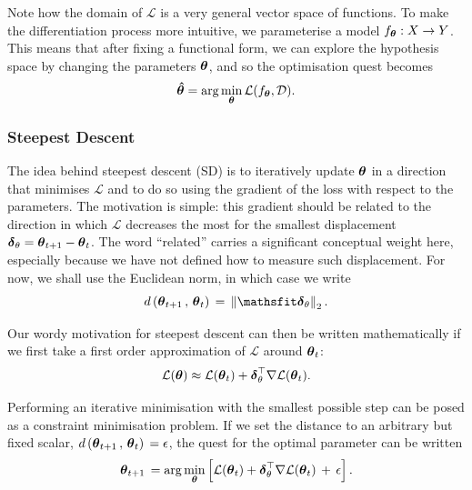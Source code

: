 Note how the domain of $\mathcal{L}$ is a very general vector space of functions. To make the differentiation process more intuitive, we parameterise a model $f_{\boldsymbol{\theta}}: X \to Y$. This means that after fixing a functional form, we can explore the hypothesis space by changing the parameters $\boldsymbol{\theta}$, and so the optimisation quest becomes
\begin{equation}
\boldsymbol{\hat{\theta}} = \text{arg}\min_{\boldsymbol{\theta}} \mathcal{L} (f_{\boldsymbol{\theta}}, \mathcal{D}).
\label{eq:optimisation}
\end{equation}

\subsubsection{Steepest Descent}\label{sub:steepest}
The idea behind steepest descent (SD) is to iteratively update $\boldsymbol{\theta}$ in a direction that minimises $\mathcal{L}$ and to do so using the gradient of the loss with respect to the parameters. The motivation is simple: this gradient should be related to the direction in which $\mathcal{L}$ decreases the most for the smallest displacement $\boldsymbol{\delta}_{\theta} = \boldsymbol{\theta}_{t+1} - \boldsymbol{\theta}_{t}$. The word ``related'' carries a significant conceptual weight here, especially because we have not defined how to measure such displacement. For now, we shall use the Euclidean norm, in which case we write
\begin{equation*}
d\left(\mvec{\theta}_{t+1}\,,\,\mvec{\theta}_{t}\right)\,=\,\norm{ \mvec{\delta}_{\theta}}_2.
\label{eq:dist}
\end{equation*}

Our wordy motivation for steepest descent can then be written mathematically if we first take a first order approximation of $\mathcal{L}$ around $\boldsymbol{\theta}_{t}$:
\begin{equation}
    \mathcal{L}(\boldsymbol{\theta}) \approx \mathcal{L}(\boldsymbol{\theta}_{t}) +  \boldsymbol{\delta}_{\theta}^\top \nabla \mathcal{L}(\boldsymbol{\theta}_{t}).
    \label{eq:taylor}
\end{equation}

Performing an iterative minimisation with the smallest possible step can be posed as a constraint minimisation problem. If we set the distance to an arbitrary but fixed scalar, $d\left(\boldsymbol{\theta}_{t+1}\,,\,\boldsymbol{\theta}_{t}\right)\,= \epsilon$, the quest for the optimal parameter can be written
\begin{align}
    \boldsymbol{\theta}_{t+1}\,=\arg \min_{\boldsymbol{\theta}}\left[\mathcal{L}(\boldsymbol{\theta}_{t}) +  \boldsymbol{\delta}_{\theta}^\top\nabla \mathcal{L}(\boldsymbol{\theta}_{t})\,+\, \epsilon \right].
    \label{eq:steepst_argmin}
\end{align}

